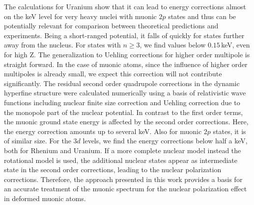 The calculations for Uranium show that it can lead to energy corrections almost on the keV level for very heavy nuclei with muonic $2p$ states and thus can be potentially relevant for comparison between theoretical predictions and experiments. Being a short-ranged potential, it falls of quickly for states further away from the nucleus. For states with $n\geq3$, we find values below $0.15\,$keV, even for high Z.
The generalization to Uehling corrections for higher order multipole is straight forward. In the case of muonic atoms, since the influence of higher order multipoles is already small, we expect this correction will not contribute significantly.
The residual second order quadrupole corrections in the dynamic hyperfine structure were calculated numerically using a basis of relativistic wave functions including nuclear finite size correction and Uehling correction due to the monopole part of the nuclear potential.
In contrast to the first order terms, the muonic ground state energy is affected by the second order corrections. Here, the energy correction amounts up to several keV. Also for muonic $2p$ states, it is of similar size. For the $3d$ levels, we find the energy corrections below half a keV, both for Rhenium and Uranium.
If a more complete nuclear model instead the rotational model is used, the additional nuclear states appear as intermediate state in the second order corrections, leading to the nuclear polarization corrections. Therefore, the approach presented in this work provides a basis for an accurate treatment of the muonic spectrum for the nuclear polarization effect in deformed muonic atoms.




